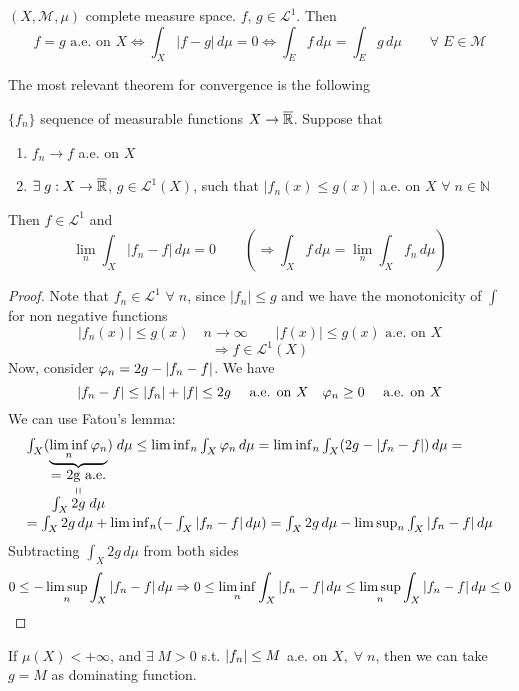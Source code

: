 \begin{theorem}
    \((X, \mathcal{M}, \mu)\) complete measure space. \(f\), \(g \in \mathcal{L}^1\). Then
    \[
        f= g \text{ a.e. on } X \Leftrightarrow \int_X |f-g| \, d\mu =0 \Leftrightarrow \int_E f \, d\mu = \int_E g \, d\mu \qquad \forall \; E \in \mathcal{M} 
    \]
\end{theorem}
The most relevant theorem for convergence is the following
\begin{theorem}
    \(\{f_n\}\) sequence of measurable functions \(X \to \overline{\mathbb{R}}\). Suppose that
    \begin{enumerate}
        \item \(f_n \to f \) a.e. on \(X\)
        \item \(\exists \; g : X \to \overline{\mathbb{R}} \), \(g \in \mathcal{L}^1(X)\), such that \(|f_n(x) \leq g(x)|\) a.e. on \(X\) \(\forall \; n \in \mathbb{N}\)
    \end{enumerate}
    Then \(f \in \mathcal{L}^1\) and 
    \[
        \lim_n \int_X |f_n -f| \, d\mu = 0 
        \qquad \left( \Rightarrow \int_X f \, d\mu = \lim_n \int_X f_n \, d\mu \right)  
    \]
\end{theorem}
\begin{proof}
    Note that \(f_n \in \mathcal{L}^1\) \(\forall \; n\), since \(|f_n| \leq g\) and we have the monotonicity of \(\int\) for non negative functions
    \[
        |f_n(x)| \leq g(x) \quad
        n \to \infty \qquad
        |f(x)| \leq g(x) \text{  a.e. on } X 
    \]
    \[ 
        \Rightarrow f \in \mathcal{L}^1(X)
    \]  
    Now, consider \(\oldphi_n = 2g - |f_n - f|\). We have
    \[
        |f_n-f| \leq |f_n|+|f| \leq 2g \quad \text{ a.e. on }X \quad \oldphi_n \geq 0 \quad \text{ a.e. on }X  
    \]
    We can use Fatou's lemma:
    \[\begin{array}{l}
        \int_X (\underbrace{\liminf_n \oldphi_n}_{\stackbelowlittle{\mbox{= 2g a.e.}}{\int_X 2g \; d\mu}}) \; d\mu \leq \liminf_n \int_X \oldphi_n \, d\mu = \liminf_n \int_X (2g - \abs{f_n - f}) \, d\mu = \\
        = \int_X 2g \, d\mu + \liminf_n (-\int_X \abs{f_n - f} \, d\mu) =\int_X 2g \, d\mu - \limsup_n \int_X \abs{f_n - f} \, d\mu
    \end{array}
    \]
    Subtracting \(\int_X 2g \, d\mu\) from both sides 
    \[
        0 \leq -\limsup_n \int_X \abs{f_n - f} \, d\mu \Rightarrow 0 \leq \liminf_n \int_X \abs{f_n - f} \, d\mu \leq \limsup_n \int_X \abs{f_n - f} \, d\mu \leq 0 
    \]  
\end{proof}
\begin{remark}
    If \(\mu(X) < +\infty\), and \(\exists \; M > 0\) s.t. \(\abs{f_n} \leq M\) a.e. on \(X, \; \forall \; n\), then we can take \(g = M\) as dominating function.
\end{remark}

